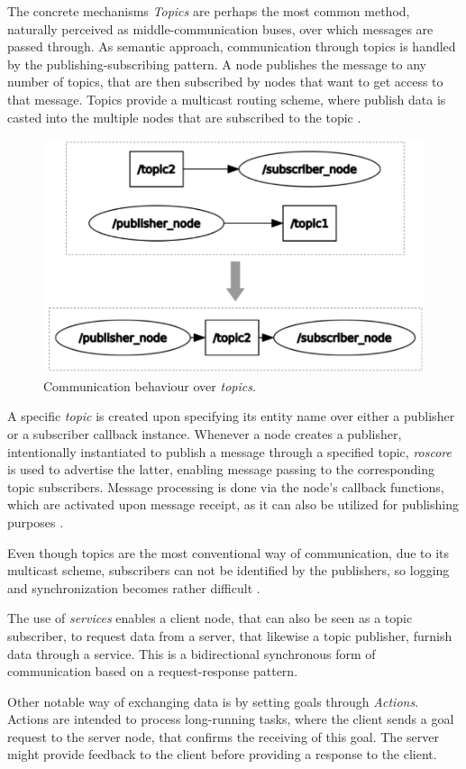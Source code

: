 The concrete mechanisms
\textit{Topics} are perhaps the most common method, naturally perceived as middle-communication buses, over which messages are passed through. As semantic approach, communication through topics is handled by the publishing-subscribing pattern. A node publishes the message to any number of topics, that are then subscribed by nodes that want to get access to that message. Topics provide a multicast routing scheme, where publish data is casted into the multiple nodes that are subscribed to the topic \cite{casini2019response}.

\begin{figure}[H]
    \centering
    \includegraphics[width=0.5\linewidth]{images/ros2-topics.png}
    \caption{Communication behaviour over \textit{topics}.}
    \label{fig:ros2-topics}
\end{figure}

A specific \textit{topic} is created upon specifying its entity name over either a publisher or a subscriber callback instance. Whenever a node creates a publisher, intentionally instantiated to publish a message through a specified topic, \textit{roscore} is used to advertise the latter, enabling message passing to the corresponding topic subscribers. Message processing is done via the node's callback functions, which are activated upon message receipt, as it can also be utilized for publishing purposes \cite{casini2019response}.

Even though topics are the most conventional way of communication, due to its multicast scheme, subscribers can not be identified by the publishers, so logging and synchronization becomes rather difficult \cite{intro-ros}.

The use of \textit{services} enables a client node, that can also be seen as a topic subscriber, to request data from a server, that likewise a topic publisher, furnish data through a service. This is a bidirectional synchronous form of communication based on a request-response pattern.

Other notable way of exchanging data is by setting goals through \textit{Actions}. Actions are intended to process long-running tasks, where the client sends a goal request to the server node, that confirms the receiving of this goal. The server might provide feedback to the client before providing a response to the client. 


